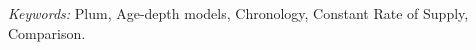 \documentclass [10pt] {article}
\begin{document}
	\bigskip
\begin{abstract}
\end{abstract}
	\noindent%
	{\it Keywords:} Plum, Age-depth models, Chronology, Constant Rate of Supply, Comparison.
	\vfill
	\newpage
\end{document}
